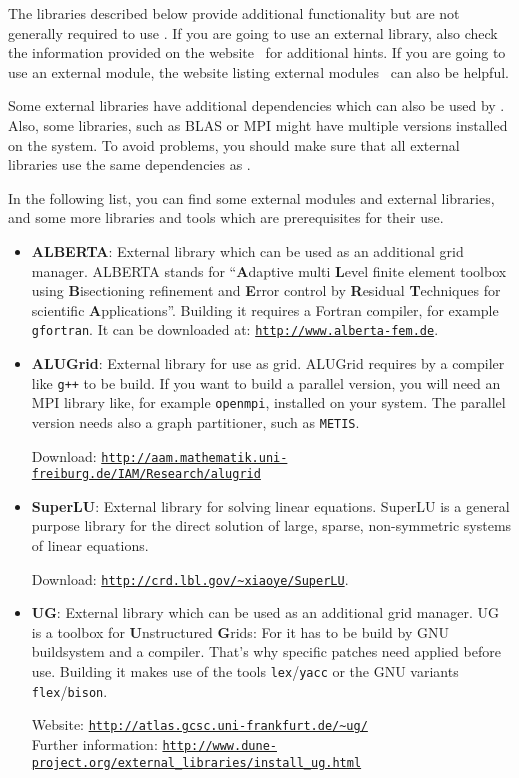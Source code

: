 The libraries described below provide additional functionality but are
not generally required to use \eWoms.  If you are going to use an
external library, also check the information provided on the \Dune
website~\cite{DUNE-EXT-LIB} for additional hints.  If you are going to
use an external \Dune module, the website listing external
modules~\cite{DUNE-EXT-MOD} can also be helpful.

Some external libraries have additional dependencies which can also be
used by \Dune.  Also, some libraries, such as BLAS or MPI might have
multiple versions installed on the system.  To avoid problems, you
should make sure that all external libraries use the same dependencies
as \Dune.

In the following list, you can find some external modules and external
libraries, and some more libraries and tools which are prerequisites
for their use.

\begin{itemize}
\item \textbf{ALBERTA}: External library which can be used as an
  additional grid manager. ALBERTA stands for ``\textbf{A}daptive multi \textbf{L}evel finite element toolbox
  using \textbf{B}isectioning refinement and \textbf{E}rror control by \textbf{R}esidual
  \textbf{T}echniques for scientific \textbf{A}pplications''. Building it requires a
  Fortran compiler, for example \texttt{gfortran}. It can be downloaded at:
  \texttt{\url{http://www.alberta-fem.de}}.

\item \textbf{ALUGrid}: External library for use as grid. ALUGrid
  requires by a \Cplusplus compiler like \texttt{g++} to be build. If
  you want to build a parallel version, you will need an MPI library
  like, for example \texttt{openmpi}, installed on your system. The
  parallel version needs also a graph partitioner, such as
  \texttt{METIS}.

  Download:
  \texttt{\url{http://aam.mathematik.uni-freiburg.de/IAM/Research/alugrid}}

\item \textbf{SuperLU}: External library for solving linear
  equations. SuperLU is a general purpose library for the direct
  solution of large, sparse, non-symmetric systems of linear
  equations.

  Download:
  \texttt{\url{http://crd.lbl.gov/~xiaoye/SuperLU}}.

\item \textbf{UG}: External library which can be used as an additional
  grid manager. UG is a toolbox for \textbf{U}nstructured
  \textbf{G}rids: For \eWoms it has to be build by GNU buildsystem and
  a \Cplusplus compiler. That's why \Dune specific patches need
  applied before use. Building it makes use of the tools
  \texttt{lex}/\texttt{yacc} or the GNU variants
  \texttt{flex}/\texttt{bison}.

  Website:
  \texttt{\url{http://atlas.gcsc.uni-frankfurt.de/~ug/}}\\
  Further information:
  \texttt{\url{http://www.dune-project.org/external_libraries/install_ug.html}}\\

\end{itemize}

